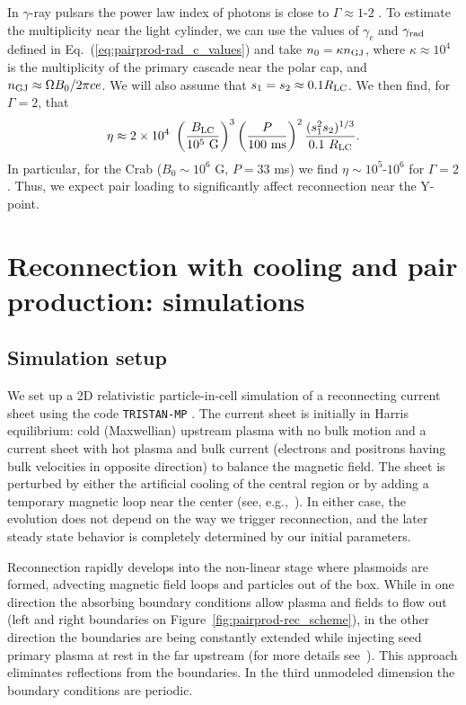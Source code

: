 In $\gamma$-ray pulsars the power law index of photons is close to $\Gamma\approx 1\text{-}2$ \citep{2013ApJS..208...17A}. To estimate the multiplicity near the light cylinder, we can use the values of $\gamma_c$ and $\gamma_{\rm rad}$ defined in Eq.~(\ref{eq:pairprod-rad_c_values}) and take $n_0 = \kappa n_{\rm GJ}$, where $\kappa\approx 10^4$ is the multiplicity of the primary cascade near the polar cap, and $n_{\rm GJ}\approx\Omega B_0 / 2\pi c e$. We will also assume that $s_1 = s_2 \approx 0.1 R_{\rm LC}$. We then find, for $\Gamma=2$, that
\begin{equation}\label{eq:pairprod-obs_mult_theory}
    \eta \approx 2\times 10^4~
    \left(\frac{B_{\rm LC}}{10^5~\text{G}}\right)^{3}
    \left(\frac{P}{100~\text{ms}}\right)^{2}
    \frac{(s_1^2 s_2)^{1/3}}{0.1~R_{\rm LC}}.
\end{equation}
In particular, for the Crab ($B_0\sim 10^6$ G, $P=33$ ms) we find $\eta\sim 10^5\text{-}10^6$ for $\Gamma=2$. Thus, we expect pair loading to significantly affect reconnection near the Y-point.


\section{Reconnection with cooling and pair production: simulations}
\label{sec:pairprod-results}

\subsection*{Simulation setup}

We set up a 2D relativistic particle-in-cell simulation of a reconnecting current sheet using the code \texttt{TRISTAN-MP} \citep{2005AIPC..801..345S}. The current sheet is initially in Harris equilibrium: cold (Maxwellian) upstream plasma with no bulk motion and a current sheet with hot plasma and bulk current (electrons and positrons having bulk velocities in opposite direction) to balance the magnetic field. The sheet is perturbed by either the artificial cooling of the central region or by adding a temporary magnetic loop near the center (see, e.g.,~\citealt{2018MNRAS.473.4840W}). In either case, the evolution does not depend on the way we trigger reconnection, and the later steady state behavior is completely determined by our initial parameters.

Reconnection rapidly develops into the non-linear stage where plasmoids are formed, advecting magnetic field loops and particles out of the box. While in one direction the absorbing boundary conditions allow plasma and fields to flow out (left and right boundaries on Figure~\ref{fig:pairprod-rec_scheme}), in the other direction the boundaries are being constantly extended while injecting seed primary plasma at rest in the far upstream (for more details see~\citealt{2014ApJ...783L..21S}). This approach eliminates reflections from the boundaries. In the third unmodeled dimension the boundary conditions are periodic.

